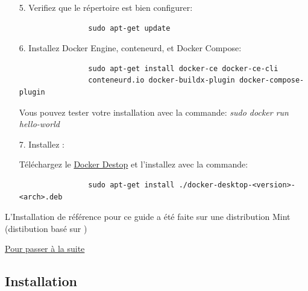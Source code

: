 \begin{itemize}
        \item[5.] Verifiez que le répertoire est bien configurer:

            \begin{lstlisting}
                sudo apt-get update
            \end{lstlisting}    

        \item[6.] Installez Docker Engine, conteneurd, et Docker Compose:

            \begin{lstlisting}
                sudo apt-get install docker-ce docker-ce-cli 
                conteneurd.io docker-buildx-plugin docker-compose-plugin
            \end{lstlisting}
            \begin{footnotesize}
                Vous pouvez tester votre installation avec la commande: \textit{sudo docker run hello-world}
            \end{footnotesize}

            \bigskip
        \item[7.] Installez \dockerdesktop{}:

        
            \begin{footnotesize}
                Téléchargez le \href{https://desktop.docker.com/linux/main/amd64/docker-desktop-4.17.0-amd64.deb?utm_source=docker&utm_medium=webreferral&utm_campaign=docs-driven-download-linux-amd64}{Docker Destop} et l'installez avec la commande:
            \end{footnotesize}

            \begin{lstlisting}
                sudo apt-get install ./docker-desktop-<version>-<arch>.deb
            \end{lstlisting}

    \end{itemize}

    \bigskip

    \begin{footnotesize}
        L'Installation de référence pour ce guide a été faite sur une distribution \linux{} Mint (distibution basé sur \ubuntu{})\\
    \end{footnotesize}

    \hyperref[sec:suite]{Pour passer à la suite}

\newpage

\subsection[Installation Windows]{Installation \windows{}\label{sec:installation_windows}}

